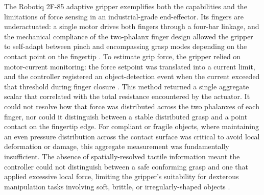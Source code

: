 \documentclass[12pt, a4paper]{report}
\begin{document}
The Robotiq 2F-85 adaptive gripper exemplifies both the capabilities and the limitations of force sensing in an industrial-grade end-effector. Its fingers are underactuated: a single motor drives both fingers through a four-bar linkage, and the mechanical compliance of the two-phalanx finger design allowed the gripper to self-adapt between pinch and encompassing grasp modes depending on the contact point on the fingertip \cite{robotiq_manual}. To estimate grip force, the gripper relied on motor-current monitoring: the force setpoint was translated into a current limit, and the controller registered an object-detection event when the current exceeded that threshold during finger closure \cite{robotiq_manual}. This method returned a single aggregate scalar that correlated with the total resistance encountered by the actuator. It could not resolve how that force was distributed across the two phalanxes of each finger, nor could it distinguish between a stable distributed grasp and a point contact on the fingertip edge. For compliant or fragile objects, where maintaining an even pressure distribution across the contact surface was critical to avoid local deformation or damage, this aggregate measurement was fundamentally insufficient. The absence of spatially-resolved tactile information meant the controller could not distinguish between a safe conforming grasp and one that applied excessive local force, limiting the gripper's suitability for dexterous manipulation tasks involving soft, brittle, or irregularly-shaped objects \cite{dahiya2010}.
\end{document}
